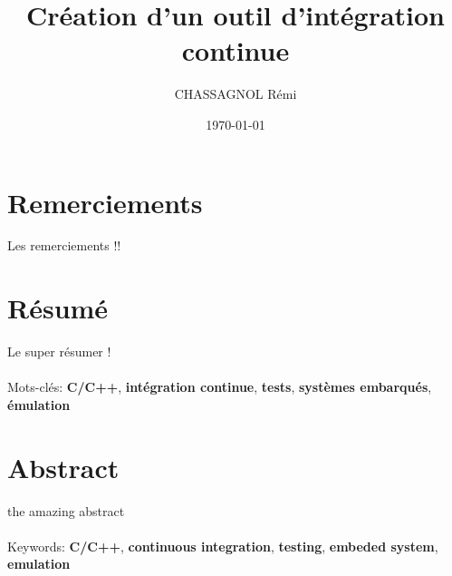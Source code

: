 \documentclass[a4paper]{article}
\title{Création d'un outil d'intégration continue}
\author{CHASSAGNOL Rémi}
\date{\today}
\begin{document}

\clearpage{}

\thispagestyle{empty}
\tableofcontents
\clearpage{}

\section*{Remerciements}
\thispagestyle{empty}

\doublespacing

Les remerciements !!

\onehalfspacing

\clearpage{}

\listoffigures
\clearpage{}

\section*{Résumé}

Le super résumer !
\\~\\

\noindent
Mots-clés: \textbf{C/C++}, \textbf{intégration continue}, \textbf{tests},
\textbf{systèmes embarqués}, \textbf{émulation}

\section*{Abstract}

the amazing abstract
\\~\\

\noindent
Keywords: \textbf{C/C++}, \textbf{continuous integration}, \textbf{testing},
\textbf{embeded system}, \textbf{emulation}
\end{document}

